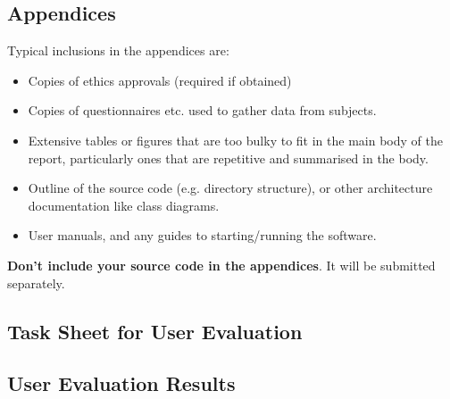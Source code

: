 \documentclass{l4proj}
\begin{document}
\begin{appendices}

\chapter{Appendices}

Typical inclusions in the appendices are:

\begin{itemize}
\item
  Copies of ethics approvals (required if obtained)
\item
  Copies of questionnaires etc. used to gather data from subjects.
\item
  Extensive tables or figures that are too bulky to fit in the main body of
  the report, particularly ones that are repetitive and summarised in the body.

\item Outline of the source code (e.g. directory structure), or other architecture documentation like class diagrams.

\item User manuals, and any guides to starting/running the software.

\end{itemize}

\textbf{Don't include your source code in the appendices}. It will be
submitted separately.

\section{Task Sheet for User Evaluation}

\section{User Evaluation Results}

\end{appendices}






\end{document}
